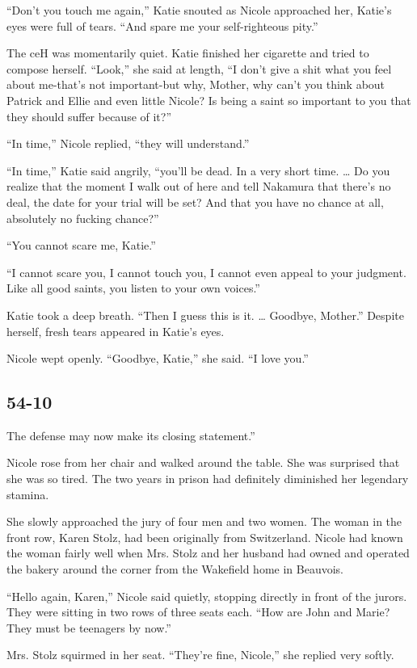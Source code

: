 \documentclass[]{article}
\begin{document}
{{“Don’t you touch me again,” Katie snouted as Nicole approached her, Katie’s eyes were full of tears. “And spare me your self-righteous pity.”

The ceH was momentarily quiet. Katie finished her cigarette and tried to compose herself. “Look,” she said at length, “I don’t give a shit what you feel about me-that’s not important-but why, Mother, why can’t you think about Patrick and Ellie and even little Nicole? Is being a saint so important to you that they should suffer because of it?”

“In time,” Nicole replied, “they will understand.”

“In time,” Katie said angrily, “you’ll be dead. In a very short time. … Do you realize that the moment I walk out of here and tell Nakamura that there’s no deal, the date for your trial will be set? And that you have no chance at all, absolutely no fucking chance?”

“You cannot scare me, Katie.”

“I cannot scare you, I cannot touch you, I cannot even appeal to your judgment. Like all good saints, you listen to your own voices.”

Katie took a deep breath. “Then I guess this is it. … Goodbye, Mother.” Despite herself, fresh tears appeared in Katie’s eyes.

Nicole wept openly. “Goodbye, Katie,” she said. “I love you.”


\subsection{54-10}


The defense may now make its closing statement.”

Nicole rose from her chair and walked around the table. She was surprised that she was so tired. The two years in prison had definitely diminished her legendary stamina.

She slowly approached the jury of four men and two women. The woman in the front row, Karen Stolz, had been originally from Switzerland. Nicole had known the woman fairly well when Mrs. Stolz and her husband had owned and operated the bakery around the corner from the Wakefield home in Beauvois.

“Hello again, Karen,” Nicole said quietly, stopping directly in front of the jurors. They were sitting in two rows of three seats each. “How are John and Marie? They must be teenagers by now.”

Mrs. Stolz squirmed in her seat. “They’re fine, Nicole,” she replied very softly.

}}
\end{document}

